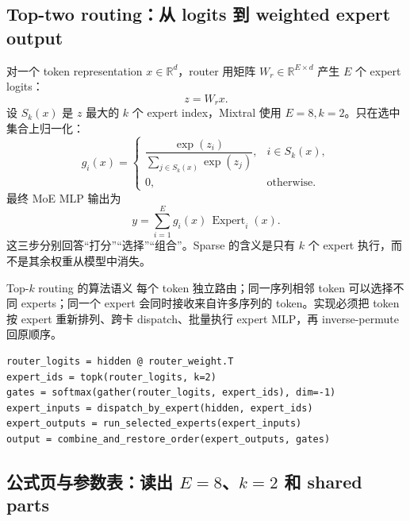 
\subsection{Top-two routing：从 logits 到 weighted expert output}

对一个 token representation $x\in\mathbb{R}^{d}$，router 用矩阵 $W_r\in\mathbb{R}^{E\times d}$ 产生 $E$ 个 expert logits：
\[
z=W_rx.
\]
设 $S_k(x)$ 是 $z$ 最大的 $k$ 个 expert index，Mixtral 使用 $E=8,k=2$。只在选中集合上归一化：
\[
g_i(x)=
\begin{cases}
\dfrac{\exp(z_i)}{\sum_{j\in S_k(x)}\exp(z_j)}, & i\in S_k(x),\\[0.8em]
0, & \text{otherwise}.
\end{cases}
\]
最终 MoE MLP 输出为
\[
y=\sum_{i=1}^{E}g_i(x)\,\operatorname{Expert}_i(x).
\]
这三步分别回答“打分”“选择”“组合”。Sparse 的含义是只有 $k$ 个 expert 执行，而不是其余权重从模型中消失。


\begin{importantbox}{Top-$k$ routing 的算法语义}
每个 token 独立路由；同一序列相邻 token 可以选择不同 experts；同一个 expert 会同时接收来自许多序列的 token。实现必须把 token 按 expert 重新排列、跨卡 dispatch、批量执行 expert MLP，再 inverse-permute 回原顺序。
\end{importantbox}

\begin{lstlisting}[caption={Top-two token routing 的最小伪代码}]
router_logits = hidden @ router_weight.T
expert_ids = topk(router_logits, k=2)
gates = softmax(gather(router_logits, expert_ids), dim=-1)
expert_inputs = dispatch_by_expert(hidden, expert_ids)
expert_outputs = run_selected_experts(expert_inputs)
output = combine_and_restore_order(expert_outputs, gates)
\end{lstlisting}


\subsection{公式页与参数表：读出 \texorpdfstring{$E=8$、$k=2$}{E=8、k=2} 和 shared parts}

